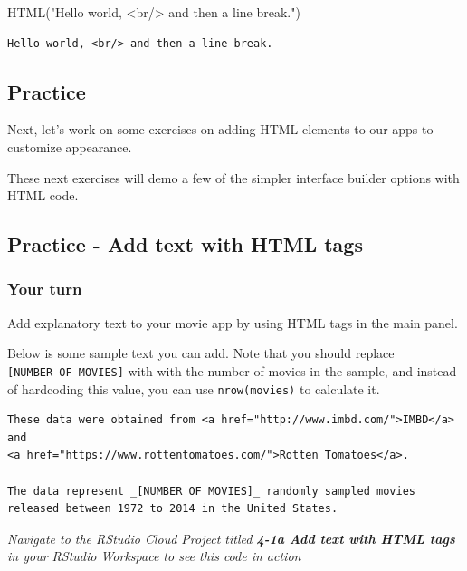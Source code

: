 \documentclass[
  letterpaper,
  DIV=11,
  numbers=noendperiod]{scrreprt}
\newenvironment{Shaded}{\begin{snugshade}}{\end{snugshade}}
\newcommand{\FunctionTok}[1]{\textcolor[rgb]{0.28,0.35,0.67}{#1}}
\newcommand{\NormalTok}[1]{\textcolor[rgb]{0.00,0.46,0.62}{#1}}
\newcommand{\StringTok}[1]{\textcolor[rgb]{0.13,0.47,0.30}{#1}}
\begin{document}
\begin{Shaded}
\begin{Highlighting}[]
\FunctionTok{HTML}\NormalTok{(}\StringTok{"Hello world, \textless{}br/\textgreater{} and then a line break."}\NormalTok{)}
\end{Highlighting}
\end{Shaded}

\begin{verbatim}
Hello world, <br/> and then a line break.
\end{verbatim}

\hypertarget{practice-1}{%
\subsection{Practice}\label{practice-1}}

Next, let's work on some exercises on adding HTML elements to our apps
to customize appearance.

These next exercises will demo a few of the simpler interface builder
options with HTML code.

\hypertarget{practice---add-text-with-html-tags}{%
\subsection{Practice - Add text with HTML
tags}\label{practice---add-text-with-html-tags}}

\hypertarget{your-turn-28}{%
\subsubsection{Your turn}\label{your-turn-28}}

Add explanatory text to your movie app by using HTML tags in the main
panel.

Below is some sample text you can add. Note that you should replace
\texttt{{[}NUMBER\ OF\ MOVIES{]}} with with the number of movies in the
sample, and instead of hardcoding this value, you can use
\texttt{nrow(movies)} to calculate it.

\begin{verbatim}
These data were obtained from <a href="http://www.imbd.com/">IMBD</a> and 
<a href="https://www.rottentomatoes.com/">Rotten Tomatoes</a>.

The data represent _[NUMBER OF MOVIES]_ randomly sampled movies released between 1972 to 2014 in the United States.
\end{verbatim}

\emph{Navigate to the RStudio Cloud Project titled \textbf{4-1a Add text
with HTML tags} in your RStudio Workspace to see this code in action}
\end{document}
